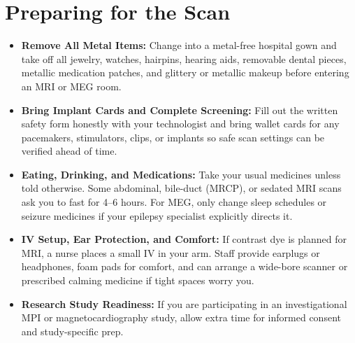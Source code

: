 \section{Preparing for the Scan}
\begin{itemize}
  \item \textbf{Remove All Metal Items:} Change into a metal-free hospital gown and take off all jewelry, watches, hairpins, hearing aids, removable dental pieces, metallic medication patches, and glittery or metallic makeup before entering an MRI or MEG room.
  \item \textbf{Bring Implant Cards and Complete Screening:} Fill out the written safety form honestly with your technologist and bring wallet cards for any pacemakers, stimulators, clips, or implants so safe scan settings can be verified ahead of time.
  \item \textbf{Eating, Drinking, and Medications:} Take your usual medicines unless told otherwise. Some abdominal, bile-duct (MRCP), or sedated MRI scans ask you to fast for 4--6 hours. For MEG, only change sleep schedules or seizure medicines if your epilepsy specialist explicitly directs it.
  \item \textbf{IV Setup, Ear Protection, and Comfort:} If contrast dye is planned for MRI, a nurse places a small IV in your arm. Staff provide earplugs or headphones, foam pads for comfort, and can arrange a wide-bore scanner or prescribed calming medicine if tight spaces worry you.
  \item \textbf{Research Study Readiness:} If you are participating in an investigational MPI or magnetocardiography study, allow extra time for informed consent and study-specific prep.
\end{itemize}

